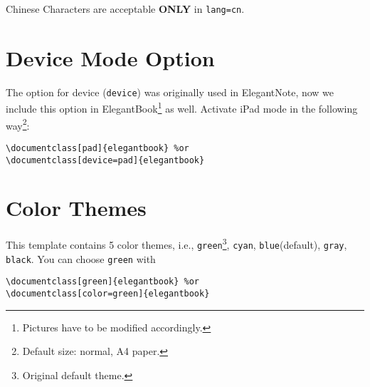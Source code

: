 \documentclass[11pt]{elegantbook}
\begin{document}
\begin{remark}
Chinese Characters  are acceptable \textbf{ONLY} in \lstinline{lang=cn}.
\end{remark}

\section{Device Mode Option}
The option for device (\lstinline{device}) was originally used in ElegantNote, now we include this option in ElegantBook\footnote{Pictures have to be modified accordingly.} as well. Activate iPad mode in the following way\footnote{Default size: normal, A4 paper.}:
\begin{lstlisting}
\documentclass[pad]{elegantbook} %or
\documentclass[device=pad]{elegantbook}
\end{lstlisting}

\section{Color Themes}
This template contains 5 color themes, i.e., \textcolor{structure1}{\lstinline{green}}\footnote{Original default theme.}, \textcolor{structure2}{\lstinline{cyan}}, \textcolor{structure3}{\lstinline{blue}}(default), \textcolor{structure4}{\lstinline{gray}}, \textcolor{structure5}{\lstinline{black}}. You can choose \lstinline{green} with
\begin{lstlisting}
\documentclass[green]{elegantbook} %or
\documentclass[color=green]{elegantbook}
\end{lstlisting}
\end{document}
